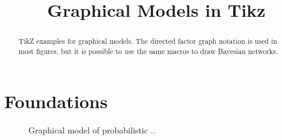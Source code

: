 \documentclass[a4paper]{article}
\title{Graphical Models in Tikz}
\begin{document}
\maketitle

\begin{abstract}
  TikZ examples for graphical models. The directed factor graph
  notation is used in most figures, but it is possible to use the same
  macros to draw Bayesian networks.
\end{abstract}



\section{Foundations}

\begin{figure}
  \begin{center}
  \end{center}
  \caption{Graphical model of probabilistic ..}
\end{figure}
\end{document}
